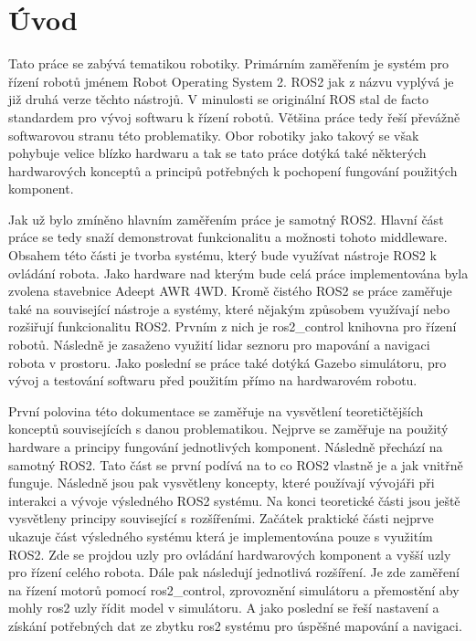 
%

\chapter{Úvod}
Tato práce se zabývá tematikou robotiky. Primárním zaměřením je systém pro řízení robotů jménem Robot Operating System 2. ROS2 jak z názvu vyplývá je již druhá verze těchto nástrojů. V minulosti se originální ROS stal de facto standardem pro vývoj softwaru k řízení robotů. Většina práce tedy řeší převážně softwarovou stranu této problematiky. Obor robotiky jako takový se však pohybuje velice blízko hardwaru a tak se tato práce dotýká také některých hardwarových konceptů a principů potřebných k pochopení fungování použitých komponent.

Jak už bylo zmíněno hlavním zaměřením práce je samotný ROS2. Hlavní část práce se tedy snaží demonstrovat funkcionalitu a možnosti tohoto middleware. Obsahem této části je tvorba systému, který bude využívat nástroje ROS2 k ovládání robota. Jako hardware nad kterým bude celá práce implementována byla zvolena stavebnice Adeept AWR 4WD. Kromě čistého ROS2 se práce zaměřuje také na související nástroje a systémy, které nějakým způsobem využívají nebo rozšiřují funkcionalitu ROS2. Prvním z nich je ros2\_control knihovna pro řízení robotů. Následně je zasaženo využití lidar seznoru pro mapování a navigaci robota v prostoru. Jako poslední se práce také dotýká Gazebo simulátoru, pro vývoj a testování softwaru před použitím přímo na hardwarovém robotu.

První polovina této dokumentace se zaměřuje na vysvětlení teoretičtějších konceptů souvisejících s danou problematikou. Nejprve se zaměřuje na použitý hardware a principy fungování jednotlivých komponent. Následně přechází na samotný ROS2. Tato část se první podívá na to co ROS2 vlastně je a jak vnitřně funguje. Následně jsou pak vysvětleny koncepty, které používají vývojáři při interakci a vývoje výsledného ROS2 systému. Na konci teoretické části jsou ještě vysvětleny principy související s rozšířeními. 
Začátek praktické části nejprve ukazuje část výsledného systému která je implementována pouze s využitím ROS2. Zde se projdou uzly pro ovládání hardwarových komponent a vyšší uzly pro řízení celého robota. 
Dále pak následují jednotlivá rozšíření. Je zde zaměření na řízení motorů pomocí ros2\_control, zprovoznění simulátoru a přemostění aby mohly ros2 uzly řídit model v simulátoru. A jako poslední se řeší nastavení a získání potřebných dat ze zbytku ros2 systému pro úspěšné mapování a navigaci.

